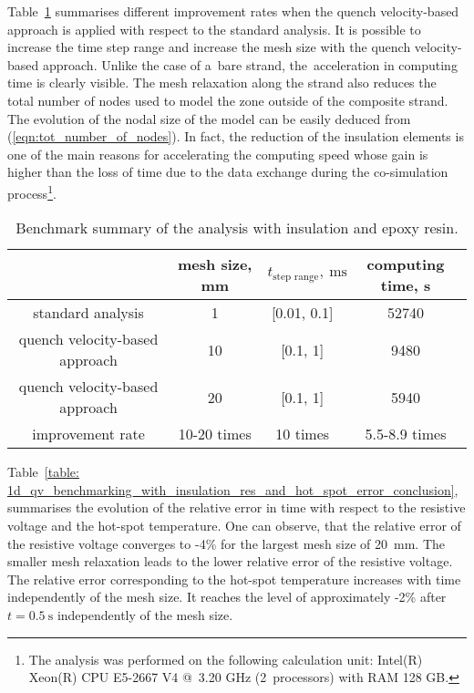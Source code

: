
Table~\ref{table: 1d_qv_benchmarking_with_insulation_methods_comparison} summarises different improvement rates when the quench velocity-based approach is applied with respect to the standard analysis. It is possible to increase the time step range and increase the mesh size with the quench velocity-based approach. Unlike the case of a~bare strand, the~acceleration in computing time is clearly visible. The mesh relaxation along the strand also reduces the total number of nodes used to model the zone outside of the composite strand. The evolution of the nodal size of the model can be easily deduced from (\ref{eqn:tot_number_of_nodes}). In fact, the reduction of the insulation elements is one of the main reasons for accelerating the computing speed whose gain is higher than the loss of time due to the data exchange during the co-simulation process\footnote{The analysis was performed on the following calculation unit: Intel(R) Xeon(R) CPU E5-2667 V4 @~3.20 GHz (2~processors) with RAM 128 GB.}.

\begin{table}[H]
    \caption{Benchmark summary of the analysis with insulation and epoxy resin.} 
    \vspace{-1.em} 
    \fontsize{10}{10}
    \selectfont 
    \renewcommand{\arraystretch}{1.5}
    \begin{center}
        \begin{tabular}{ cccc }  
        \hline
          & mesh size, mm & $t_\text{step range},~\text{ms}$ & computing time, s\\
        \hline
        standard analysis & 1 & [0.01, 0.1] & 52740 \\
        quench velocity-based approach & 10 & [0.1, 1] & 9480 \\
        quench velocity-based approach & 20 & [0.1, 1] & 5940 \\
        \hline 
        improvement rate & 10-20 times & 10 times & 5.5-8.9 times \\
        \end{tabular}
    \end{center}  
     \label{table: 1d_qv_benchmarking_with_insulation_methods_comparison} 
 \end{table}
 
Table~\ref{table: 1d_qv_benchmarking_with_insulation_res_and_hot_spot_error_conclusion}, summarises the evolution of the relative error in time with respect to the resistive voltage and the hot-spot temperature. One can observe, that the relative error of the resistive voltage converges to -4\% for the largest mesh size of 20~mm. The smaller mesh relaxation leads to the lower relative error of the resistive voltage. The relative error corresponding to the hot-spot temperature increases with time independently of the mesh size. It reaches the level of approximately -2\% after $t=0.5~\text{s}$ independently of the mesh size. 

